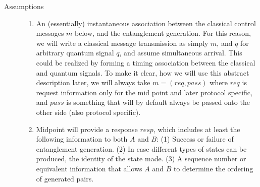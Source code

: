 \documentclass{article}
\begin{document}
\begin{description}
\item[Assumptions]

\begin{enumerate}
\item An (essentially) instantaneous association between the classical control messages $m$ below, and the entanglement generation. For this reason, we will write a classical message transmission as simply $m$, and $q$ for arbitrary quantum signal $q$, and assume simultaneous arrival.
This could be realized by forming a timing association between the classical and quantum signals. To make it clear, how we will use this abstract description later, we will always take $m = (req, pass)$ where $req$ is request information only for the mid point and later protocol specific, and $pass$ is something that will by default always be passed onto the other side (also protocol specific).

\item Midpoint will provide a response $resp$, which includes at least the following information to both $A$ and $B$:
(1) Success or failure of entanglement generation. (2) In case different types of states can be produced, the identity of the state made. (3) A sequence number or equivalent information
that allows $A$ and $B$ to determine the ordering of generated pairs.
\end{enumerate}
\end{description}
\end{document}

